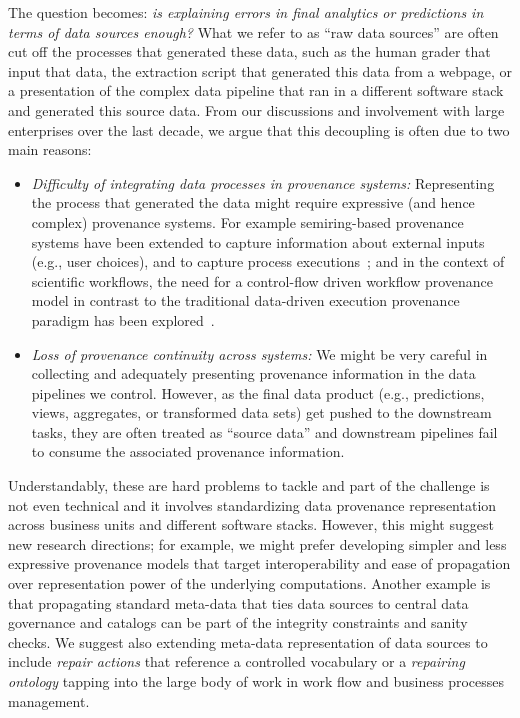 \documentclass[11pt]{article}
\begin{document}
The question becomes: \emph{is explaining errors in final analytics or predictions in terms of data sources enough?} What we refer to as ``raw data sources''  are often cut off the processes that generated these data, such as the human grader that input that data, the extraction script that generated this data from a webpage, or a presentation of the complex data pipeline that ran in a different software stack and generated this source data. From our discussions and involvement with large enterprises over the last decade, we argue that this decoupling is often due to two main reasons:
\begin{itemize}
\item \emph{Difficulty of integrating data processes in provenance systems:} Representing the process that generated the data might require expressive (and hence  complex) provenance systems. For example semiring-based  provenance systems have been extended  to capture information about external inputs (e.g., user choices), and  to capture process executions~\cite{DBLP:journals/vldb/DeutchMT15}; and in the context of scientific workflows,  the need for a control-flow driven workflow provenance model in contrast to the traditional  data-driven execution provenance paradigm has been explored~\cite{DBLP:journals/dke/ButtF21}.

\item \emph{Loss of provenance continuity across systems:}  We might be very careful in collecting and adequately presenting provenance information in the data pipelines we control. However, as the final data product (e.g., predictions, views, aggregates, or transformed data sets) get pushed to the downstream tasks, they are often treated as ``source data'' and downstream pipelines fail to  consume the associated provenance information.
\end{itemize}

Understandably, these are hard problems to tackle and part of the challenge is not even technical and it involves standardizing data provenance representation across business units and different software stacks. However, this might suggest new research directions; for example, we might prefer developing simpler and less expressive provenance models that target interoperability and ease of propagation over representation power of the underlying computations. Another example is that propagating standard meta-data that ties data sources to central data governance and catalogs can be part of the integrity constraints and sanity checks. We suggest also extending meta-data representation of data sources to include {\em repair actions} that reference a controlled vocabulary or a {\em repairing ontology} tapping into the large body of work in work flow and business processes management.
\end{document}
